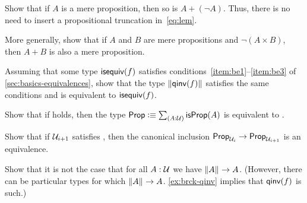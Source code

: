 \begin{ex}\label{ex:lem-mereprop}
  Show that if $A$ is a mere proposition, then so is $A+(\neg A)$.
  Thus, there is no need to insert a propositional truncation in~\eqref{eq:lem}.
\end{ex}

\begin{ex}\label{ex:disjoint-or}
  More generally, show that if $A$ and $B$ are mere propositions and $\neg(A\times B)$, then $A+B$ is also a mere proposition.
\end{ex}




\begin{ex}\label{ex:brck-qinv}
  Assuming that some type $\mathsf{isequiv}(f)$ satisfies conditions~\ref{item:be1}--\ref{item:be3} of \autoref{sec:basics-equivalences}, show that the type $\mathopen{}\left\Vert \mathsf{qinv}(f)\right\Vert_{}\mathclose{}$ satisfies the same conditions and is equivalent to $\mathsf{isequiv}(f)$.
\end{ex}

\begin{ex}\label{ex:lem-impl-prop-equiv-bool}
  Show that if \LEM{} holds, then the type $\prop \defeq \sm{A:\type} \isprop(A)$ is equivalent to \bool.
\end{ex}

\begin{ex}\label{ex:lem-impred}
  Show that if $\mathcal{U}_{i+1}$ satisfies \LEM{}, then the canonical inclusion $\mathsf{Prop}_{\mathcal{U}_i} \to \mathsf{Prop}_{\mathcal{U}_{i+1}}$ is an equivalence.
\end{ex}

\begin{ex}\label{ex:not-brck-A-impl-A}
  Show that it is not the case that for all $A:\mathcal{U}$ we have $\mathopen{}\left\Vert A\right\Vert_{}\mathclose{} \to A$.
  (However, there can be particular types for which $\mathopen{}\left\Vert A\right\Vert_{}\mathclose{}\to A$.
  \autoref{ex:brck-qinv} implies that $\mathsf{qinv}(f)$ is such.)
\end{ex}

